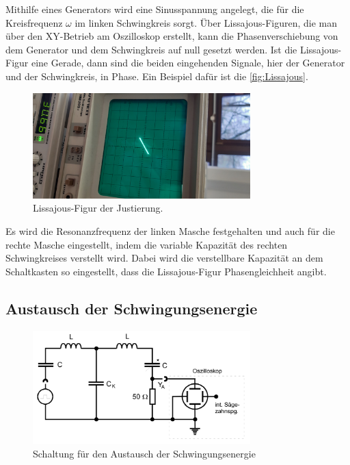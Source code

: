\noindent Mithilfe eines Generators wird eine Sinusspannung angelegt, die  für die Kreisfrequenz $\omega$ im linken Schwingkreis sorgt. 
Über Lissajous-Figuren, die man über den XY-Betrieb am Oszilloskop erstellt, kann die Phasenverschiebung von dem Generator und 
dem Schwingkreis auf null gesetzt werden. Ist die Lissajous-Figur eine Gerade, dann sind die beiden eingehenden Signale, hier der
Generator und der Schwingkreis, in Phase. Ein Beispiel dafür ist die \autoref{fig:Lissajous}.
\begin{figure}[H]
    \centering
    \includegraphics[width=0.75\textwidth, angle=-90]{plots/Lissajour-Gerade.jpeg}
    \caption{Lissajous-Figur der Justierung.}
    \label{fig:Lissajous}
\end{figure}

\noindent Es wird die Resonanzfrequenz der linken Masche festgehalten und auch für die rechte Masche eingestellt, indem die variable Kapazität
des rechten Schwingkreises verstellt wird. Dabei wird die verstellbare Kapazität an dem Schaltkasten so eingestellt, dass die Lissajous-Figur Phasengleichheit 
angibt.

\subsection{Austausch der Schwingungsenergie}
\begin{figure}[H]
    \centering
    \includegraphics[width=0.75\textwidth]{plots/Schaltung1.png}
    \caption{Schaltung für den Austausch der Schwingungsenergie \cite{Versuchsanleitung}}
    \label{fig:schaltung1}
\end{figure}

